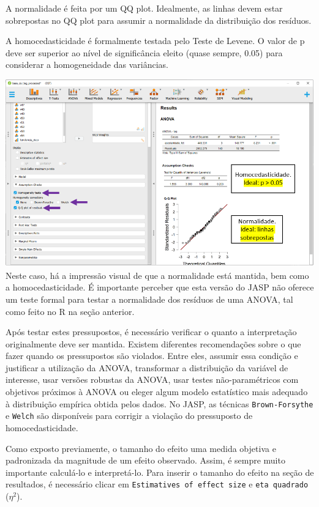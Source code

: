\documentclass[
]{book}
\begin{document}
A normalidade é feita por um QQ plot. Idealmente, as linhas devem estar
sobrepostas no QQ plot para assumir a normalidade da distribuição dos
resíduos.

A homocedasticidade é formalmente testada pelo Teste de Levene. O valor
de p deve ser superior ao nível de significância eleito (quase sempre,
0.05) para considerar a homogeneidade das variâncias.

\includegraphics{./img/cap_anova_assumptions2.png} Neste caso, há a
impressão visual de que a normalidade está mantida, bem como a
homocedasticidade. É importante perceber que esta versão do JASP não
oferece um teste formal para testar a normalidade dos resíduos de uma
ANOVA, tal como feito no R na seção anterior.

Após testar estes pressupostos, é necessário verificar o quanto a
interpretação originalmente deve ser mantida. Existem diferentes
recomendações sobre o que fazer quando os pressupostos são violados.
Entre eles, assumir essa condição e justificar a utilização da ANOVA,
transformar a distribuição da variável de interesse, usar versões
robustas da ANOVA, usar testes não-paramétricos com objetivos próximos à
ANOVA ou eleger algum modelo estatístico mais adequado à distribuição
empírica obtida pelos dados. No JASP, as técnicas
\texttt{Brown-Forsythe} e \texttt{Welch} são disponíveis para corrigir a
violação do pressuposto de homocedasticidade.

Como exposto previamente, o tamanho do efeito uma medida objetiva e
padronizada da magnitude de um efeito observado. Assim, é sempre muito
importante calculá-lo e interpretá-lo. Para inserir o tamanho do efeito
na seção de resultados, é necessário clicar em
\texttt{Estimatives\ of\ effect\ size} e \texttt{eta\ quadrado}
(\(\eta^2\)).
\end{document}
